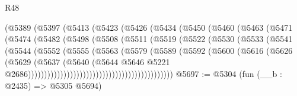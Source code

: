 \begin{lexlean}{R48}
\begin{coremodule}
                          (@5389
                            (@5397
                              (@5413
                                (@5423
                                  (@5426
                                    (@5434
                                      (@5450
                                        (@5460
                                          (@5463
                                            (@5471
                                              (@5474
                                                (@5482
                                                  (@5498
                                                    (@5508
                                                      (@5511
                                                        (@5519
                                                          (@5522
                                                            (@5530
                                                              (@5533
                                                                (@5541
                                                                  (@5544
                                                                    (@5552
                                                                      (@5555
                                                                        (@5563
                                                                          (@5579
                                                                            (@5589
                                                                              (@5592
                                                                                (@5600
                                                                                  (@5616
                                                                                    (@5626
                                                                                      (@5629
                                                                                        (@5637
                                                                                          (@5640
                                                                                            (@5644
                                                                                              @5646
                                                                                              @5221
                                                                                              @2686)))))))))))))))))))))))))))))))))))))))))))))
@5697 := @5304 (fun (__b : @2435) => @5305 @5694)

\end{coremodule}
\end{lexlean}

